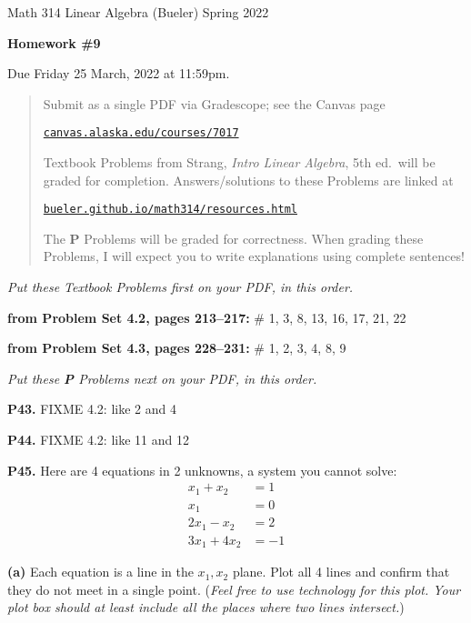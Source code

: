\documentclass[12pt]{amsart}
\newcommand{\prob}[1]{\bigskip\noindent\textbf{#1.}\quad }
\newcommand{\probset}[2]{\bigskip\noindent\textbf{from Problem Set #1, pages #2:}\quad }
\newcommand{\epart}[1]{\medskip\noindent\textbf{(#1)}\quad }
\begin{document}
\scriptsize \noindent Math 314 Linear Algebra (Bueler) \hfill Spring 2022
\normalsize\medskip

\Large
\centerline{\textbf{Homework \#9}}

\bigskip
\large
\centerline{Due Friday 25 March, 2022 at 11:59pm.}

\normalsize
\bigskip
\begin{quote}
\medskip
\noindent Submit as a single PDF via Gradescope; see the Canvas page

\href{https://canvas.alaska.edu/courses/7017}{\texttt{canvas.alaska.edu/courses/7017}}

\noindent Textbook Problems from Strang, \emph{Intro Linear Algebra}, 5th ed.~will be graded for completion.  Answers/solutions to these Problems are linked at

\href{https://bueler.github.io/math314/resources.html}{\texttt{bueler.github.io/math314/resources.html}}

\noindent The \textbf{P} Problems will be graded for correctness.  When grading these Problems, I will expect you to write explanations using complete sentences!
\end{quote}
\medskip

\thispagestyle{empty}

\noindent \hrulefill

\noindent \emph{Put these Textbook Problems first on your PDF, in this order.}

\probset{4.2}{213--217} \# 1, 3, 8, 13, 16, 17, 21, 22

\probset{4.3}{228--231} \# 1, 2, 3, 4, 8, 9


\bigskip
\noindent \hrulefill

\noindent \emph{Put these \textbf{P} Problems next on your PDF, in this order.}

\prob{P43}  FIXME 4.2: like 2 and 4

\prob{P44}  FIXME 4.2: like 11 and 12

\prob{P45}  Here are 4 equations in 2 unknowns, a system you cannot solve:
\begin{align*}
x_1 + x_2 &= 1 \\
x_1 \qquad &= 0 \\
2 x_1 - x_2 &= 2 \\
3 x_1 + 4 x_2 &= -1
\end{align*}

\epart{a} Each equation is a line in the $x_1,x_2$ plane.  Plot all 4 lines and confirm that they do not meet in a single point.  (\emph{Feel free to use technology for this plot.  Your plot box should at least include all the places where two lines intersect.})
\end{document}
